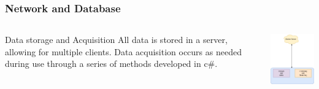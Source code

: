 \documentclass{beamer}
\begin{document}
\begin{frame}
    \frametitle{Network and Database}

    \begin{columns}
        \begin{column}{0.48\textwidth}
            \begin{block}{Data storage and Acquisition}
                All data is stored in a server, allowing for multiple clients. Data acquisition occurs as needed during use through a series of methods developed in c\#.
            \end{block}
        \end{column}
        \begin{column}{0.48\textwidth}
            \includegraphics[width=5cm]{Simple Diagram.png}
        \end{column}
    \end{columns}

\end{frame}
\end{document}
